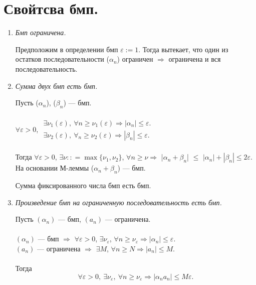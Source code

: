 \section{Свойтсва бмп.}
\begin{enumerate}
	\item \textit{Бмп ограничена.}
	\begin{Proof}
		Предположим в определении бмп $\varepsilon:=1$. Тогда вытекает, что один из остатков последовательности ($\alpha_n$) ограничен $\Rightarrow$ ограничена и вся последовательность.
	\end{Proof}
	\item \textit{Сумма двух бмп есть бмп.} 
	\begin{Proof}
		Пусть ($\alpha_n$), ($\beta_n$) --- бмп.\\\\
		$\forall\varepsilon>0$, 
		$\begin{matrix} \exists\nu_1(\varepsilon),\ \forall n \geqslant \nu_1(\varepsilon)\Rightarrow |\alpha_n| \leqslant \varepsilon.\\
			\exists\nu_2(\varepsilon),\ \forall_n \geqslant \nu_2(\varepsilon)\Rightarrow |\beta_n| \leqslant \varepsilon.
		\end{matrix}$\\\\
		Тогда $\forall\varepsilon>0$, $\exists\nu:: = \max\{\nu_1,\nu_2\}$, $\forall n \geqslant\nu \Rightarrow$ |$\alpha_n + \beta_n$| $\leqslant$ $|\alpha_n| + |\beta_n| \leqslant 2\varepsilon$. На основании М-леммы ($\alpha_n + \beta_n$) --- бмп.
	\end{Proof}
	\begin{cor}
		Сумма фиксированного числа бмп есть бмп.
	\end{cor}
	\item \textit{Произведение бмп на ограниченную последовательность есть бмп.}
	\begin{Proof}
		Пусть $(\alpha_n)$ --- бмп, $(a_n)$ --- ограничена.\\\\
		$(\alpha_n)$ --- бмп $\Rightarrow$ $\forall\varepsilon>0$, $ \exists\nu_\varepsilon$, $\forall n  \geqslant \nu_\varepsilon \Rightarrow |\alpha_n| \leqslant \varepsilon$.\\
		$(a_n)$ --- ограничена $\Rightarrow$ $\exists M$, $\forall n  \geqslant N \Rightarrow |a_n| \leqslant M$.\\\\
		Тогда $$\forall\varepsilon>0,\ \exists\nu_\varepsilon,\ \forall n  \geqslant \nu_\varepsilon \Rightarrow |\alpha_n a_n|\leqslant M \varepsilon.$$

\end{Proof}
\end{enumerate}
